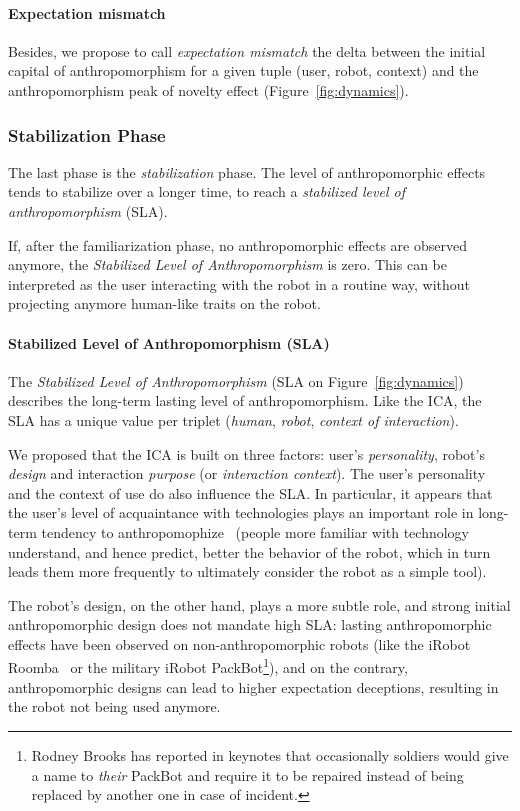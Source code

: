 \documentclass{frontiersSCNS} %
\begin{document}
\paragraph{Expectation mismatch}

Besides, we propose to call \emph{expectation mismatch} the delta between the
initial capital of anthropomorphism for a given tuple (user, robot, context)
and the anthropomorphism peak of novelty effect (Figure~\ref{fig:dynamics}).

\subsubsection{Stabilization Phase}
\label{sec:stabilization}

The last phase is the \emph{stabilization} phase. The level of anthropomorphic
effects tends to stabilize over a longer time, to reach a \emph{stabilized
level of anthropomorphism} (SLA).

If, after the familiarization phase, no anthropomorphic effects are observed
anymore, the \emph{Stabilized Level of Anthropomorphism} is zero. This can
be interpreted as the user interacting with the robot in a routine way, without
projecting anymore human-like traits on the robot.


\paragraph{Stabilized Level of Anthropomorphism (SLA)}

The \emph{Stabilized Level of Anthropomorphism} (SLA on
Figure~\ref{fig:dynamics}) describes the long-term lasting level of
anthropomorphism.  Like the ICA, the SLA has a unique value per triplet
(\emph{human}, \emph{robot}, \emph{context of interaction}).

We proposed that the ICA is built on three factors: user's \emph{personality},
robot's \emph{design} and interaction \emph{purpose} (or \emph{interaction
context}). The user's personality and the context of use do also influence the
SLA. In particular, it appears that the user's level of acquaintance with
technologies plays an important role in long-term tendency to
anthropomophize~\cite{fink_living_2013} (people more familiar with technology
understand, and hence predict, better the behavior of the robot, which in turn
leads them more frequently to ultimately consider the robot as a simple tool).

The robot's design, on the other hand, plays a more subtle role, and strong
initial anthropomorphic design does not mandate high SLA: lasting
anthropomorphic effects have been observed on non-anthropomorphic robots (like
the iRobot Roomba~\cite{fink_living_2013} or the military iRobot
PackBot\footnote{Rodney Brooks has reported in keynotes that occasionally
soldiers would give a name to \emph{their} PackBot and require it to be repaired
instead of being replaced by another one in case of incident.}), and on the
contrary, anthropomorphic designs can lead to higher expectation deceptions,
resulting in the robot not being used anymore.
\end{document}
